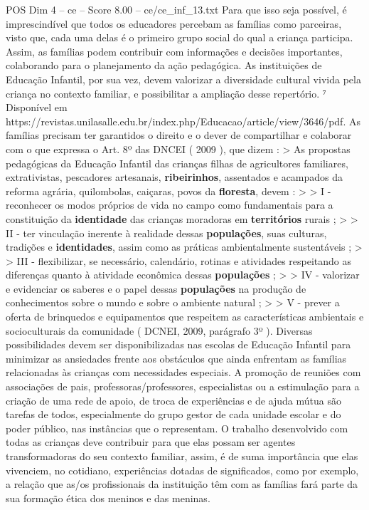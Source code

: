 \begin{textsample}{POS Dim 4 – ce – Score 8.00 – ce/ce\_inf\_13.txt}
Para que isso seja possível, é imprescindível que todos os educadores percebam as famílias como parceiras, visto que, cada uma delas é o primeiro grupo social do qual a criança participa.
Assim, as famílias podem contribuir com informações e decisões importantes, colaborando para o planejamento da ação pedagógica.
As instituições de Educação Infantil, por sua vez, devem valorizar a diversidade cultural vivida pela criança no contexto familiar, e possibilitar a ampliação desse repertório. ⁷ Disponível em https://revistas.unilasalle.edu.br/index.php/Educacao/article/view/3646/pdf.
As famílias precisam ter garantidos o direito e o dever de compartilhar e colaborar com o que expressa o Art. 8º das DNCEI ( 2009 ), que dizem : > As propostas pedagógicas da Educação Infantil das crianças filhas de agricultores familiares, extrativistas, pescadores artesanais, \textbf{ribeirinhos}, assentados e acampados da reforma agrária, quilombolas, caiçaras, povos da \textbf{floresta}, devem : > > I - reconhecer os modos próprios de vida no campo como fundamentais para a constituição da \textbf{identidade} das crianças moradoras em \textbf{territórios} rurais ; > > II - ter vinculação inerente à realidade dessas \textbf{populações}, suas culturas, tradições e \textbf{identidades}, assim como as práticas ambientalmente sustentáveis ; > > III - flexibilizar, se necessário, calendário, rotinas e atividades respeitando as diferenças quanto à atividade econômica dessas \textbf{populações} ; > > IV - valorizar e evidenciar os saberes e o papel dessas \textbf{populações} na produção de conhecimentos sobre o mundo e sobre o ambiente natural ; > > V - prever a oferta de brinquedos e equipamentos que respeitem as características ambientais e socioculturais da comunidade ( DCNEI, 2009, parágrafo 3º ).
Diversas possibilidades devem ser disponibilizadas nas escolas de Educação Infantil para minimizar as ansiedades frente aos obstáculos que ainda enfrentam as famílias relacionadas às crianças com necessidades especiais.
A promoção de reuniões com associações de pais, professoras/professores, especialistas ou a estimulação para a criação de uma rede de apoio, de troca de experiências e de ajuda mútua são tarefas de todos, especialmente do grupo gestor de cada unidade escolar e do poder público, nas instâncias que o representam.
O trabalho desenvolvido com todas as crianças deve contribuir para que elas possam ser agentes transformadoras do seu contexto familiar, assim, é de suma importância que elas vivenciem, no cotidiano, experiências dotadas de significados, como por exemplo, a relação que as/os profissionais da instituição têm com as famílias fará parte da sua formação ética dos meninos e das meninas.

\end{textsample}
